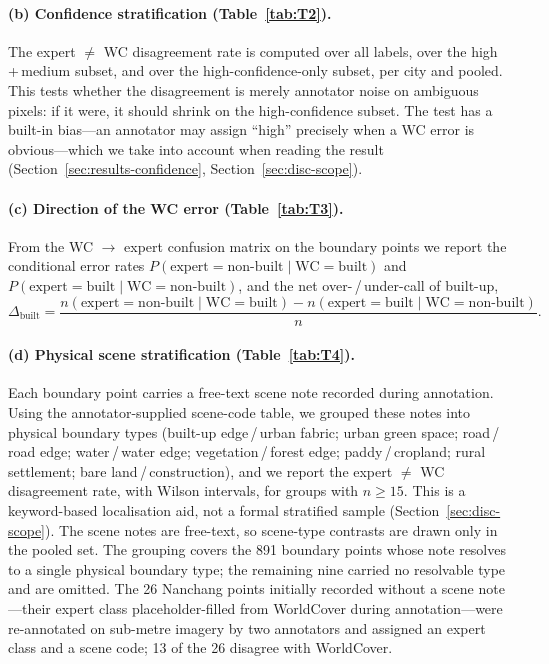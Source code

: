 \documentclass[remotesensing,article,submit,moreauthors]{Definitions/mdpi}
\begin{document}
\paragraph{(b) Confidence stratification (Table~\ref{tab:T2}).}
The expert $\neq$ WC disagreement rate is computed over all labels, over the
high\,+\,medium subset, and over the high-confidence-only subset, per city and
pooled. This tests whether the disagreement is merely annotator noise on
ambiguous pixels: if it were, it should shrink on the high-confidence subset.
The test has a built-in bias---an annotator may assign ``high'' precisely when
a WC error is obvious---which we take into account when reading the result
(Section~\ref{sec:results-confidence}, Section~\ref{sec:disc-scope}).

\paragraph{(c) Direction of the WC error (Table~\ref{tab:T3}).}
From the WC $\to$ expert confusion matrix on the boundary points we report the
conditional error rates $P(\text{expert} = \text{non-built} \mid \text{WC} =
\text{built})$ and $P(\text{expert} = \text{built} \mid \text{WC} =
\text{non-built})$, and the net over-\,/\,under-call of built-up,
%
\begin{equation}\label{eq:netbuilt}
\Delta_{\text{built}} = \frac{n(\text{expert} = \text{non-built} \mid \text{WC} = \text{built})
- n(\text{expert} = \text{built} \mid \text{WC} = \text{non-built})}{n}.
\end{equation}

\paragraph{(d) Physical scene stratification (Table~\ref{tab:T4}).}
Each boundary point carries a free-text scene note recorded during annotation.
Using the annotator-supplied scene-code table, we grouped these notes into
physical boundary types (built-up edge\,/\,urban fabric; urban green space;
road\,/\,road edge; water\,/\,water edge; vegetation\,/\,forest edge;
paddy\,/\,cropland; rural settlement; bare land\,/\,construction), and we report
the expert $\neq$ WC disagreement rate, with Wilson intervals, for groups with
$n \ge 15$. This is a keyword-based localisation aid, not a formal stratified
sample (Section~\ref{sec:disc-scope}). The scene notes are free-text, so
scene-type contrasts are drawn only in the pooled set. The grouping covers the
891 boundary points whose note resolves to a single physical boundary type; the
remaining nine carried no resolvable type and are omitted. The 26 Nanchang
points initially recorded without a scene note---their expert class
placeholder-filled from WorldCover during annotation---were re-annotated on
sub-metre imagery by two annotators and assigned an expert class and a scene
code; 13 of the 26 disagree with WorldCover.
\end{document}
